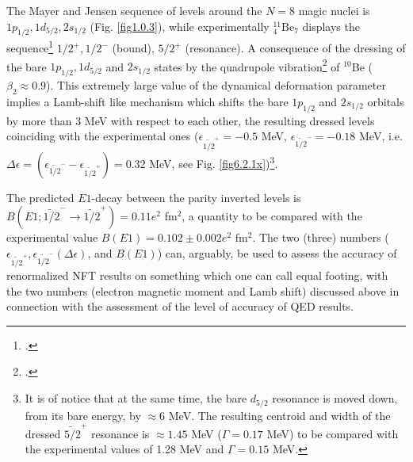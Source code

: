 The Mayer and Jensen sequence of levels around the  $N=8$ magic nuclei is $1p_{1/2},1d_{5/2},2s_{1/2}$ (Fig. \ref{fig1.0.3}), while experimentally $^{11}_{4}$Be$_{7}$ displays the sequence\footnote{\cite{Kwan:14}.} $1/2^+,1/2^-$ (bound), $5/2^+$ (resonance). A consequence of the dressing of the bare $1p_{1/2},1d_{5/2}$ and  $2s_{1/2}$ states by the quadrupole vibration\footnote{\cite{Barranco:17}.} of $^{10}$Be ($\beta_2\approx0.9$). This extremely
large value of the dynamical deformation parameter implies a Lamb-shift like mechanism which shifts the bare $1p_{1/2}$ and $2s_{1/2}$ orbitals by more than 3 MeV with respect to each other, the resulting dressed levels coinciding with the experimental ones ($\epsilon_{\widetilde {1/2}^+}=-0.5$ MeV, $\epsilon_{\widetilde {1/2}^-}=-0.18$ MeV, i.e. $\Delta\epsilon=\left(\epsilon_{\widetilde {1/2}^-}-\epsilon_{\widetilde {1/2}^+}\right)=0.32$ MeV, see Fig. \ref{fig6.2.1x})\footnote{It is of notice that at the same time, the bare $d_{5/2}$ resonance is moved down, from its bare energy, by $\approx6$ MeV. The resulting centroid and width of the dressed $\widetilde{5/2}^+$ resonance is $\approx1.45$ MeV ($\Gamma=0.17$ MeV) to be compared with the experimental values of 1.28 MeV and $\Gamma=0.15$ MeV.}. 

 The predicted $E1$-decay between the parity inverted levels is $B(E1;\widetilde{1/2}^-\to\widetilde{1/2}^+)=0.11e^2$ fm$^2$, a quantity to be compared with the experimental value $B(E1)=0.102\pm0.002e^2$ fm$^2$. The two (three) numbers ($\epsilon_{\widetilde{1/2}^+},\epsilon_{\widetilde {1/2}^-} (\Delta\epsilon)$, and $B(E1)$) can, arguably, be used to assess the accuracy of renormalized NFT results on something which one can call equal footing, with the two numbers (electron magnetic moment and Lamb shift) discussed above in connection with the assessment of the level of accuracy of QED results. 


